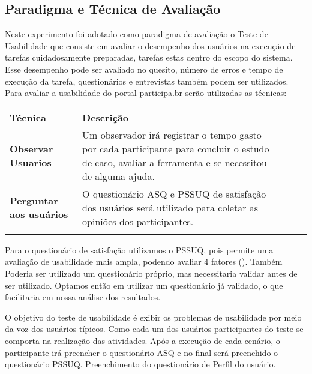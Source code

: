 \subsection{Paradigma e Técnica de Avaliação}

Neste experimento foi adotado como paradigma de avaliação o Teste de Usabilidade que consiste em avaliar o desempenho dos usuários na execução de tarefas cuidadosamente preparadas, tarefas estas dentro do escopo do sistema. Esse desempenho pode ser avaliado no quesito, número de erros e tempo de execução da tarefa, questionários e entrevistas também podem ser utilizados.
Para avaliar a usabilidade do portal participa.br serão utilizadas as técnicas:


\begin{table}[h]
\begin{tabular}{lllll}
\cline{1-2}
\multicolumn{1}{|l|}{\textbf{Técnica}}                & \multicolumn{1}{l|}{\textbf{Descrição}}                                                                                                                                    &  &  &  \\ \cline{1-2}
\multicolumn{1}{|l|}{\textbf{Observar Usuarios}}      & \multicolumn{1}{l|}{Um observador irá registrar o tempo gasto por cada participante para concluir o estudo de caso, avaliar a ferramenta e se necessitou de alguma ajuda.} &  &  &  \\ \cline{1-2}
\multicolumn{1}{|l|}{\textbf{Perguntar aos usuários}} & \multicolumn{1}{l|}{O questionário ASQ e PSSUQ de satisfação dos usuários será utilizado para coletar as opiniões dos participantes.}                                      &  &  &  \\ \cline{1-2}
                                                      &                                                                                                                                                                            &  &  & 
\end{tabular}
\end{table}


Para o questionário de satisfação utilizamos o PSSUQ, pois permite uma avaliação de usabilidade mais ampla, podendo avaliar 4 fatores (). Também Poderia ser utilizado um questionário próprio, mas necessitaria validar antes de ser utilizado. Optamos então em utilizar um questionário já validado, o que facilitaria em nossa análise dos resultados.

O objetivo do teste de usabilidade é exibir os problemas de usabilidade por meio da voz dos usuários típicos. Como cada um dos usuários participantes do teste se comporta na realização das atividades.
	Após a execução de cada cenário, o participante irá preencher o questionário ASQ e no final será preenchido o questionário PSSUQ.
	Preenchimento do questionário de Perfil do usuário.

